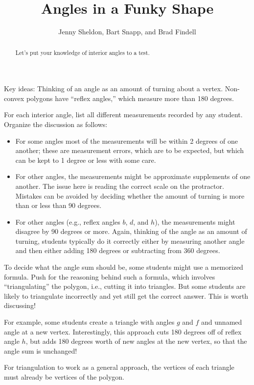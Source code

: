 \documentclass[instructornotes,nooutcomes]{ximera}
\title{Angles in a Funky Shape}
\author{Jenny Sheldon, Bart Snapp, and Brad Findell}
\begin{document}
\begin{abstract}
  Let's put your knowledge of interior angles to a test.
\end{abstract}
\maketitle

\begin{teachingnote}
Key ideas: Thinking of an angle as an amount of turning about a vertex.  Non-convex polygons have ``reflex angles,'' which measure more than 180 degrees.  

For each interior angle, list all different measurements recorded by any student.  
Organize the discussion as follows: 
\begin{itemize}
\item For some angles most of the measurements will be within 2 degrees of one another; these are measurement errors, which are to be expected, but which can be kept to 1 degree or less with some care.  
\item For other angles, the measurements might be approximate supplements of one another.  The issue here is reading the correct scale on the protractor.  Mistakes can be avoided by deciding whether the amount of turning is more than or less than 90 degrees.  
\item For other angles (e.g., reflex angles $b$, $d$, and $h$), the measurements might disagree by 90 degrees or more.  Again, thinking of the angle as an amount of turning, students typically do it correctly either by measuring another angle and then either adding 180 degrees or subtracting from 360 degrees.
\end{itemize}

To decide what the angle sum should be, some students might use a memorized formula.  Push for the reasoning
behind such a formula, which involves ``triangulating'' the polygon, i.e., cutting it into triangles.  But some students are likely to triangulate incorrectly and yet still get the correct answer.  This is worth discussing! 
 
For example, some students create a triangle with angles $g$ and $f$ and unnamed angle at a new vertex.  Interestingly, this approach cuts 180 degrees off of reflex angle $h$, but adds 180 degrees worth of new angles at the new vertex, so that the angle sum is unchanged!  

For triangulation to work as a general approach, the vertices of each triangle must already be vertices of the polygon.  

\end{teachingnote}
\end{document}
